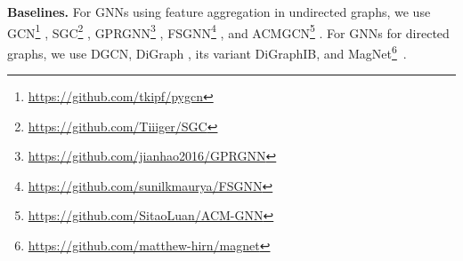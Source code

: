 \begin{table*}[t]
\label{tb:accuracy}
\end{table*} 
\smallskip \noindent \textbf{Baselines. }
For GNNs using feature aggregation in undirected graphs, we use GCN\footnote{\url{https://github.com/tkipf/pygcn}} \cite{kipf2017semi}, SGC\footnote{\url{https://github.com/Tiiiger/SGC}} \cite{wu2019simplifying}, 
GPRGNN\footnote{\url{https://github.com/jianhao2016/GPRGNN}} \cite{chien2021adaptive}, FSGNN\footnote{\url{https://github.com/sunilkmaurya/FSGNN}} \cite{maurya2021improving},
and ACMGCN\footnote{\url{https://github.com/SitaoLuan/ACM-GNN}} \cite{luan2022revisiting}. 
For GNNs for directed graphs, we use DGCN\cite{tong2020directed}, DiGraph \cite{tong2020digraph}, its variant DiGraphIB, and MagNet\footnote{\url{https://github.com/matthew-hirn/magnet}}~\cite{zhang2021magnet}. 
